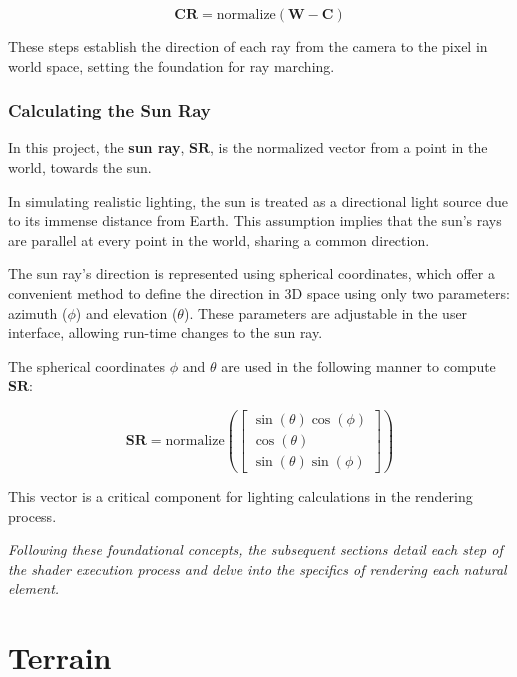 \begin{equation}
   \mathbf{CR} = \text{normalize}(\mathbf{W} - \mathbf{C})
\end{equation}

These steps establish the direction of each ray from the camera to the pixel in world space, setting the foundation for ray marching.

\subsubsection{Calculating the Sun Ray}

In this project, the \textbf{sun ray}, $\mathbf{SR}$, is the normalized vector from a point in the world, towards the sun. 

In simulating realistic lighting, the sun is treated as a directional light source due to its immense distance from Earth. This assumption implies that the sun's rays are parallel at every point in the world, sharing a common direction.

The sun ray's direction is represented using spherical coordinates, which offer a convenient method to define the direction in 3D space using only two parameters: azimuth ($\phi$) and elevation ($\theta$). These parameters are adjustable in the user interface, allowing run-time changes to the sun ray.

The spherical coordinates $\phi$ and $\theta$ are used in the following manner to compute $\mathbf{SR}$:

\begin{equation}
    \mathbf{SR} = \text{normalize}\left( \begin{bmatrix} \sin(\theta) \cos(\phi) \\ \cos(\theta) \\ \sin(\theta) \sin(\phi) \end{bmatrix} \right)
\end{equation}

This vector is a critical component for lighting calculations in the rendering process.

\textit{Following these foundational concepts, the subsequent sections detail each step of the shader execution process and delve into the specifics of rendering each natural element.
}

\section{Terrain}
\label{Terrain}

